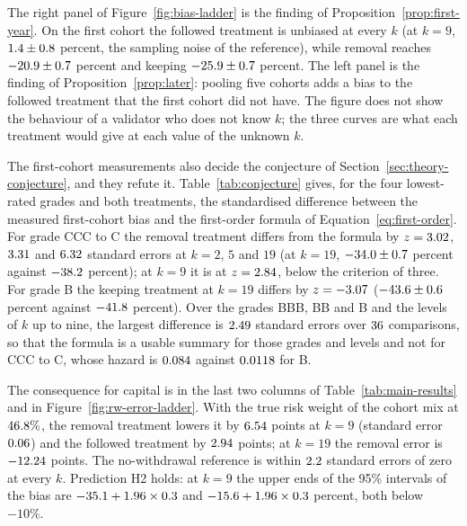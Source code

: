 The right panel of Figure~\ref{fig:bias-ladder} is the finding of Proposition~\ref{prop:first-year}. On the first cohort the followed treatment is unbiased at every $k$ (at $k=9$, $1.4\pm0.8$ percent, the sampling noise of the reference), while removal reaches $-20.9\pm0.7$ percent and keeping $-25.9\pm0.7$ percent. The left panel is the finding of Proposition~\ref{prop:later}: pooling five cohorts adds a bias to the followed treatment that the first cohort did not have. The figure does not show the behaviour of a validator who does not know $k$; the three curves are what each treatment would give at each value of the unknown $k$.

The first-cohort measurements also decide the conjecture of Section~\ref{sec:theory-conjecture}, and they refute it. Table~\ref{tab:conjecture} gives, for the four lowest-rated grades and both treatments, the standardised difference between the measured first-cohort bias and the first-order formula of Equation~\eqref{eq:first-order}. For grade CCC to C the removal treatment differs from the formula by $z=3.02$, $3.31$ and $6.32$ standard errors at $k=2$, $5$ and $19$ (at $k=19$, $-34.0\pm0.7$ percent against $-38.2$ percent); at $k=9$ it is at $z=2.84$, below the criterion of three. For grade B the keeping treatment at $k=19$ differs by $z=-3.07$ ($-43.6\pm0.6$ percent against $-41.8$ percent). Over the grades BBB, BB and B and the levels of $k$ up to nine, the largest difference is $2.49$ standard errors over $36$ comparisons, so that the formula is a usable summary for those grades and levels and not for CCC to C, whose hazard is $0.084$ against $0.0118$ for B.



The consequence for capital is in the last two columns of Table~\ref{tab:main-results} and in Figure~\ref{fig:rw-error-ladder}. With the true risk weight of the cohort mix at $46.8\%$, the removal treatment lowers it by $6.54$ points at $k=9$ (standard error $0.06$) and the followed treatment by $2.94$ points; at $k=19$ the removal error is $-12.24$ points. The no-withdrawal reference is within $2.2$ standard errors of zero at every $k$. Prediction H2 holds: at $k=9$ the upper ends of the 95\% intervals of the bias are $-35.1+1.96\times0.3$ and $-15.6+1.96\times0.3$ percent, both below $-10\%$.

